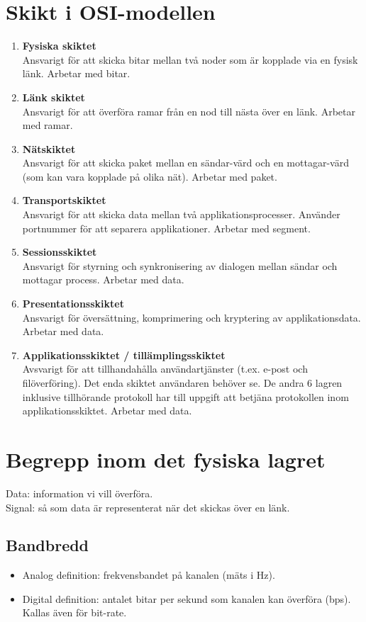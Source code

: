 \documentclass[11pt]{article}
\begin{document}
\section{Skikt i OSI-modellen}
\begin{enumerate}
\item{\textbf{Fysiska skiktet}\\
	Ansvarigt för att skicka bitar mellan två noder som är kopplade via en fysisk länk. Arbetar med bitar.}
\item{\textbf{Länk skiktet} \\
	Ansvarigt för att överföra ramar från en nod till nästa över en länk. Arbetar med ramar.}
\item{\textbf{Nätskiktet} \\
	Ansvarigt för att skicka paket mellan en sändar-värd och en mottagar-värd (som kan vara kopplade på olika nät). Arbetar med paket.}
\item{\textbf{Transportskiktet} \\
	Ansvarigt för att skicka data mellan två applikationsprocesser. Använder portnummer för att separera applikationer. Arbetar med segment.}
\item{\textbf{Sessionsskiktet} \\
	Ansvarigt för styrning och synkronisering av dialogen mellan sändar och mottagar process. Arbetar med data.}
\item{\textbf{Presentationsskiktet} \\
	Ansvarigt för översättning, komprimering och kryptering av applikationsdata. Arbetar med data.}
\item{\textbf{Applikationsskiktet / tillämplingsskiktet} \\
	Avsvarigt för att tillhandahålla användartjänster (t.ex. e-post och filöverföring). Det enda skiktet användaren behöver se. De andra 6 lagren inklusive tillhörande protokoll har till uppgift att betjäna protokollen inom applikationsskiktet. Arbetar med data.}
\end{enumerate}
\section{Begrepp inom det fysiska lagret}
Data: information vi vill överföra. \\
Signal: så som data är representerat när det skickas över en länk.
\subsection{Bandbredd}
\begin{itemize}
\item{Analog definition: frekvensbandet på kanalen (mäts i Hz).}
\item{Digital definition: antalet bitar per sekund som kanalen kan överföra (bps). Kallas även för bit-rate.}
\end{itemize}
\end{document}
